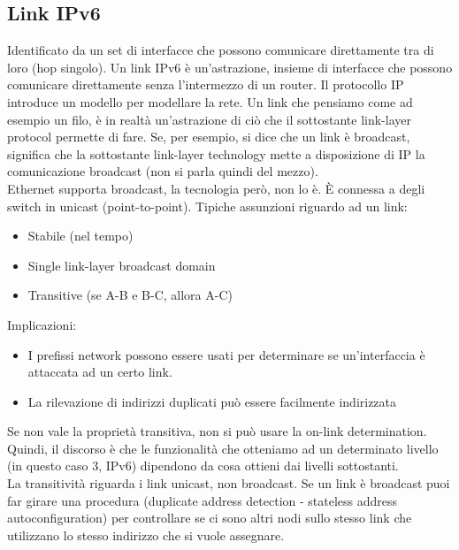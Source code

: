 \documentclass{article}
\begin{document}
\subsection{Link IPv6}
Identificato da un set di interfacce che possono comunicare direttamente tra di loro (hop singolo). Un link IPv6 è un’astrazione, insieme di interfacce che possono comunicare direttamente senza l’intermezzo di un router. Il protocollo IP introduce un modello per modellare la rete. Un link che pensiamo come ad esempio un filo, è in realtà un'astrazione di ciò che il sottostante link-layer protocol permette di fare. Se, per esempio, si dice che un link è broadcast, significa che la sottostante link-layer technology mette a disposizione di IP la comunicazione broadcast (non si parla quindi del mezzo). \\ Ethernet supporta broadcast, la tecnologia però, non lo è. È connessa a degli switch in unicast (point-to-point).
Tipiche assunzioni riguardo ad un link:
\begin{itemize}
    \item Stabile (nel tempo)
    \item Single link-layer broadcast domain
    \item Transitive (se A-B e B-C, allora A-C)
\end{itemize}{}
Implicazioni:
\begin{itemize}
    \item I prefissi network possono essere usati per determinare se un'interfaccia è attaccata ad un certo link.
    \item La rilevazione di indirizzi duplicati può essere facilmente indirizzata
\end{itemize}{}
Se non vale la proprietà transitiva, non si può usare la on-link determination. Quindi, il discorso è che le funzionalità che otteniamo ad un determinato livello (in questo caso 3, IPv6) dipendono da cosa ottieni dai livelli sottostanti.\\ La transitività riguarda i link unicast, non broadcast. Se un link è broadcast puoi far girare una procedura (duplicate address detection - stateless address autoconfiguration) per controllare se ci sono altri nodi sullo stesso link che utilizzano lo stesso indirizzo che si vuole assegnare.
\end{document}
